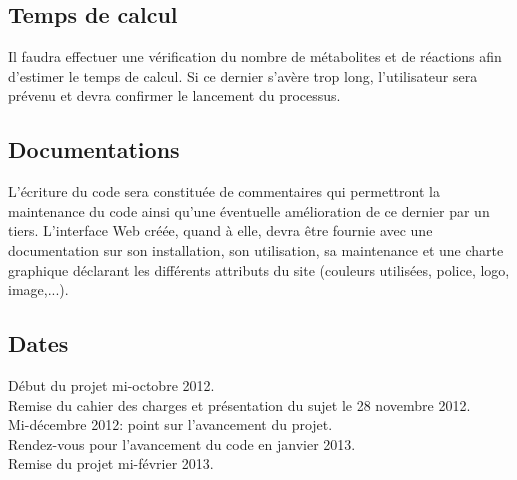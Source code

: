 \subsection{Temps de calcul}
Il faudra effectuer une vérification du nombre de métabolites et de réactions afin d'estimer le temps de calcul. Si ce dernier s'avère trop long, l'utilisateur sera prévenu et devra confirmer le lancement du processus. 

\subsection{Documentations}
L'écriture du code sera constituée de commentaires qui permettront la maintenance du code ainsi qu'une éventuelle amélioration de ce dernier par un tiers.
L'interface Web créée, quand à elle, devra être fournie avec une documentation sur son installation, son utilisation, sa maintenance et une charte graphique déclarant les différents attributs du site (couleurs utilisées, police, logo, image,...).

\subsection{Dates}
Début du projet mi-octobre 2012. \\
Remise du cahier des charges et présentation du sujet le 28 novembre 2012.  \\
Mi-décembre 2012: point sur l'avancement du projet.\\
Rendez-vous pour l'avancement du code en janvier 2013.\\
Remise du projet mi-février 2013.